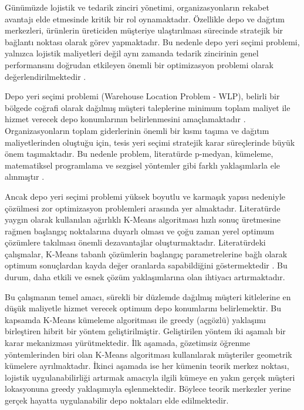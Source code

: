 \documentclass[conference]{IEEEtran}
\begin{document}
Günümüzde lojistik ve tedarik zinciri yönetimi, organizasyonların rekabet avantajı elde etmesinde kritik bir rol oynamaktadır. Özellikle depo ve dağıtım merkezleri, ürünlerin üreticiden müşteriye ulaştırılması sürecinde stratejik bir bağlantı noktası olarak görev yapmaktadır. Bu nedenle depo yeri seçimi problemi, yalnızca lojistik maliyetleri değil aynı zamanda tedarik zincirinin genel performansını doğrudan etkileyen önemli bir optimizasyon problemi olarak değerlendirilmektedir \cite{owen1998strategic,sagnak2020depo}.
 
Depo yeri seçimi problemi (Warehouse Location Problem - WLP), belirli bir bölgede coğrafi olarak dağılmış müşteri taleplerine minimum toplam maliyet ile hizmet verecek depo konumlarının belirlenmesini amaçlamaktadır \cite{you2019optimal}. Organizasyonların toplam giderlerinin önemli bir kısmı taşıma ve dağıtım maliyetlerinden oluştuğu için, tesis yeri seçimi stratejik karar süreçlerinde büyük önem taşımaktadır. Bu nedenle problem, literatürde p-medyan, kümeleme, matematiksel programlama ve sezgisel yöntemler gibi farklı yaklaşımlarla ele alınmıştır \cite{karagul2014pmedyan}.
 
Ancak depo yeri seçimi problemi yüksek boyutlu ve karmaşık yapısı nedeniyle çözülmesi zor optimizasyon problemleri arasında yer almaktadır. Literatürde yaygın olarak kullanılan ağırlıklı K-Means algoritması hızlı sonuç üretmesine rağmen başlangıç noktalarına duyarlı olması ve çoğu zaman yerel optimum çözümlere takılması önemli dezavantajlar oluşturmaktadır. Literatürdeki çalışmalar, K-Means tabanlı çözümlerin başlangıç parametrelerine bağlı olarak optimum sonuçlardan kayda değer oranlarda sapabildiğini göstermektedir \cite{you2019optimal}. Bu durum, daha etkili ve esnek çözüm yaklaşımlarına olan ihtiyacı artırmaktadır.
 
Bu çalışmanın temel amacı, sürekli bir düzlemde dağılmış müşteri kitlelerine en düşük maliyetle hizmet verecek optimum depo konumlarını belirlemektir. Bu kapsamda K-Means kümeleme algoritması ile greedy (açgözlü) yaklaşımı birleştiren hibrit bir yöntem geliştirilmiştir. Geliştirilen yöntem iki aşamalı bir karar mekanizması yürütmektedir. İlk aşamada, gözetimsiz öğrenme yöntemlerinden biri olan K-Means algoritması kullanılarak müşteriler geometrik kümelere ayrılmaktadır. İkinci aşamada ise her kümenin teorik merkez noktası, lojistik uygulanabilirliği artırmak amacıyla ilgili kümeye en yakın gerçek müşteri lokasyonuna greedy yaklaşımıyla eşlenmektedir. Böylece teorik merkezler yerine gerçek hayatta uygulanabilir depo noktaları elde edilmektedir.
 
\end{document}
